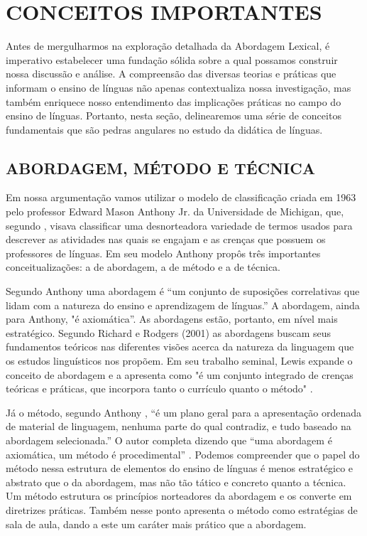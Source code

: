 \section{CONCEITOS IMPORTANTES}

Antes de mergulharmos na exploração detalhada da Abordagem Lexical, é imperativo estabelecer uma fundação sólida sobre a qual possamos construir nossa discussão e análise. A compreensão das diversas teorias e práticas que informam o ensino de línguas não apenas contextualiza nossa investigação, mas também enriquece nosso entendimento das implicações práticas no campo do ensino de línguas. Portanto, nesta seção, delinearemos uma série de conceitos fundamentais que são pedras angulares no estudo da didática de línguas.

\subsection{ABORDAGEM, MÉTODO E TÉCNICA}

Em nossa argumentação vamos utilizar o modelo de classificação criada em 1963 pelo professor Edward Mason Anthony Jr. da Universidade de Michigan, que, segundo , visava classificar uma desnorteadora variedade de termos usados para descrever as atividades nas quais se engajam e as crenças que possuem os professores de línguas. Em seu modelo Anthony propôs três importantes conceitualizações: a de abordagem, a de método e a de técnica.

Segundo Anthony uma abordagem é “um conjunto de suposições correlativas que lidam com a natureza do ensino e aprendizagem de línguas.” \cite[p. 19]{richards2001} A abordagem, ainda para Anthony, "é axiomática”. As abordagens estão, portanto, em nível mais estratégico. Segundo Richard e Rodgers (2001) as abordagens buscam seus fundamentos teóricos nas diferentes visões acerca da natureza da linguagem que os estudos linguísticos nos propõem. Em seu trabalho seminal, Lewis expande o conceito de abordagem e a apresenta como "é um conjunto integrado de crenças teóricas e práticas, que incorpora tanto o currículo quanto o método" \cite[p. 14]{lewis1993}.

Já o método, segundo Anthony \cite{richards2001}, “é um plano geral para a apresentação ordenada de material de linguagem, nenhuma parte do qual contradiz, e tudo baseado na abordagem selecionada.” O autor completa dizendo que “uma abordagem é axiomática, um método é procedimental” \cite[p. 19]{richards2001}. Podemos compreender que o papel do método nessa estrutura de elementos do ensino de línguas é menos estratégico e abstrato que o da abordagem, mas não tão tático e concreto quanto a técnica. Um método estrutura os princípios norteadores da abordagem e os converte em diretrizes práticas. Também nesse ponto  apresenta o método como estratégias de sala de aula, dando a este um caráter mais prático que a abordagem.

